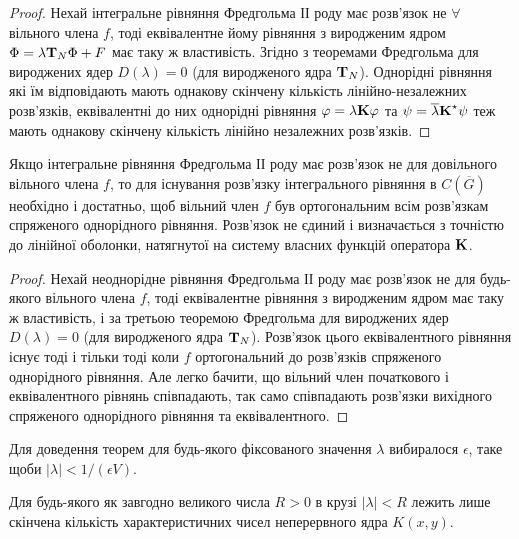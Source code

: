 \begin{proof}
	Нехай інтегральне рівняння Фредгольма ІІ роду має розв'язок не $\forall$ вільного члена $f$, тоді еквівалентне йому рівняння з виродженим ядром $\Phi = \lambda \bf{T}_N \Phi + F$  має таку ж властивість. Згідно з теоремами Фредгольма для вироджених ядер $D(\lambda) = 0$ (для виродженого ядра $\bf{T}_N$). Однорідні рівняння які їм відповідають мають однакову скінчену кількість лінійно-незалежних розв'язків, еквівалентні до них однорідні рівняння  $\phi = \lambda \bf{K} \phi$ та $\psi = \overline \lambda \bf{K}^\star \psi$ теж мають однакову скінчену кількість лінійно незалежних розв'язків.
\end{proof}

\begin{theorem}
	Якщо інтегральне рівняння Фредгольма ІІ роду має розв'язок не для довільного вільного члена $f$, то для існування розв'язку інтегрального рівняння в $C\left(\overline G\right)$ необхідно і достатньо, щоб вільний член $f$ був ортогональним всім розв'язкам спряженого однорідного рівняння. Розв'язок не єдиний і визначається з точністю до лінійної оболонки, натягнутої на систему власних функцій оператора $\bf{K}$.
\end{theorem}

\begin{proof}
	Нехай неоднорідне рівняння Фредгольма ІІ роду має розв'язок не для будь-якого вільного члена $f$, тоді еквівалентне рівняння з виродженим ядром має таку ж властивість, і за третьою теоремою Фредгольма для вироджених ядер $D(\lambda) = 0$ (для виродженого ядра $\bf{T}_N$). Розв'язок цього еквівалентного рівняння існує тоді і тільки тоді коли $f$ ортогональний до розв'язків спряженого однорідного рівняння. Але легко бачити, що вільний член початкового і еквівалентного рівнянь співпадають, так само співпадають розв'язки вихідного спряженого однорідного рівняння та еквівалентного.
\end{proof}

\begin{remark}
	Для доведення теорем для будь-якого фіксованого значення $\lambda$ вибиралося $\epsilon$, таке щоби $|\lambda| < 1 / (\epsilon V)$.
\end{remark}

\begin{theorem}
	Для будь-якого як завгодно великого числа $R > 0$ в крузі $|\lambda| < R$ лежить лише скінчена кількість характеристичних чисел неперервного ядра $K(x, y)$.
\end{theorem}

